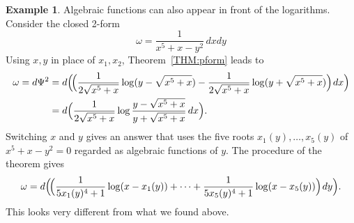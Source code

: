 \documentclass{amsart}
\theoremstyle{definition}
\newtheorem{example}[thm]{Example}
\numberwithin{equation}{section}
\numberwithin{thm}{section}
\begin{document}
\begin{example}
\label{EXAM:2formalgebraic}
Algebraic functions can also appear in front of the logarithms.  Consider the closed 2-form
\[
\omega = \frac{1}{x^5 + x - y^2}\,dxdy
\]
Using $x,y$ in place of $x_1,x_2$, Theorem~\ref{THM:pform} leads to
\begin{align*}
\omega = d\Psi^2 &= d\Big(\!\Big(\frac{1}{2\sqrt{x^5+x}}\log(y-\sqrt{x^5+x}) - \frac{1}{2\sqrt{x^5+x}}\log(y+\sqrt{x^5+x})\Big)\hskip1pt dx\Big)\\
&= d\Big(\frac{1}{2\sqrt{x^5+x}}\log \frac{y-\sqrt{x^5+x}}{y+\sqrt{x^5+x}}\,dx\Big).
\end{align*}
Switching $x$ and $y$ gives an answer that uses the five roots $x_1(y),\dots,x_5(y)$ of $x^5 + x - y^2 = 0$ regarded as algebraic functions of $y$.  The procedure of the theorem gives
\[
\omega = d\Big(\!\Big(\frac{1}{5x_1(y)^4+ 1}\log(x - x_1(y)) + \cdots + \frac{1}{5x_5(y)^4+ 1}\log(x - x_5(y)) \Big)\hskip1pt dy\Big).
\]
This looks very different from what we found above.
\end{example}
\end{document}
